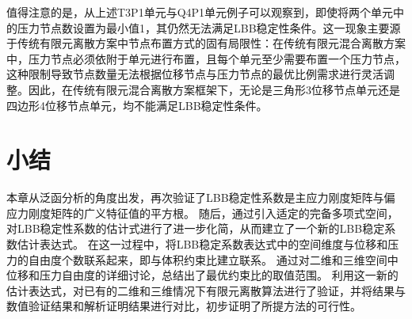 值得注意的是，从上述T3P1单元与Q4P1单元例子可以观察到，即使将两个单元中的压力节点数设置为最小值1，其仍然无法满足LBB稳定性条件。这一现象主要源于传统有限元离散方案中节点布置方式的固有局限性：在传统有限元混合离散方案中，压力节点必须依附于单元进行布置，且每个单元至少需要布置一个压力节点，这种限制导致节点数量无法根据位移节点与压力节点的最优比例需求进行灵活调整。因此，在传统有限元混合离散方案框架下，无论是三角形3位移节点单元还是四边形4位移节点单元，均不能满足LBB稳定性条件。

\section{小结}
本章从泛函分析的角度出发，再次验证了LBB稳定性系数是主应力刚度矩阵与偏应力刚度矩阵的广义特征值的平方根。
随后，通过引入适定的完备多项式空间，对LBB稳定性系数的估计式进行了进一步化简，从而建立了一个新的LBB稳定系数估计表达式。
在这一过程中，将LBB稳定系数表达式中的空间维度与位移和压力的自由度个数联系起来，即与体积约束比建立联系。
通过对二维和三维空间中位移和压力自由度的详细讨论，总结出了最优约束比的取值范围。
利用这一新的估计表达式，对已有的二维和三维情况下有限元离散算法进行了验证，并将结果与数值验证结果和解析证明结果进行对比，初步证明了所提方法的可行性。
